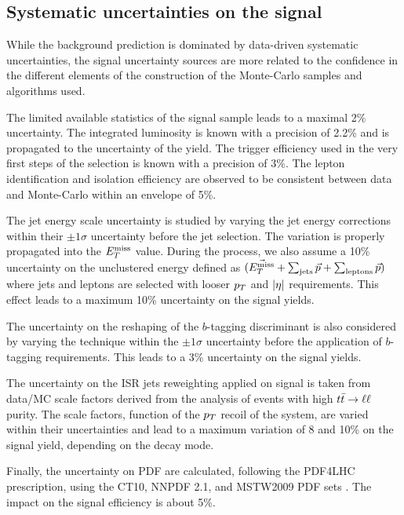     \subsection{Systematic uncertainties on the signal}

    While the background prediction is dominated by data-driven systematic
    uncertainties, the signal uncertainty sources are more related to the
    confidence in the different elements of the construction of the Monte-Carlo
    samples and algorithms used.

    The limited available statistics of the signal sample leads to a maximal
    2\% uncertainty. The integrated luminosity is known with a precision of 2.2\%
    and is propagated to the uncertainty of the yield. The trigger efficiency
    used in the very first steps of the selection is known with a precision of 3\%.
    The lepton identification and isolation efficiency are observed to be consistent
    between data and Monte-Carlo within an envelope of 5\%.

    The jet energy scale uncertainty is studied by varying the jet energy corrections
    within their $\pm1\sigma$ uncertainty before the jet selection. The variation is
    properly propagated into the $E_T^\text{miss}$ value. During the process, we also assume a
    10\% uncertainty on the unclustered energy defined as $(\vec{E_T^\text{miss}} + \sum_\text{jets}
    \vec{p} + \sum_\text{leptons} \vec{p})$ where jets and leptons are selected with looser
    $p_T$ and $\left| \eta \right|$ requirements. This effect leads to a maximum 10\% uncertainty on
    the signal yields.

    The uncertainty on the reshaping of the $b$-tagging discriminant is also considered
    by varying the technique within the $\pm1\sigma$ uncertainty before the application of
    $b$-tagging requirements. This leads to a 3\% uncertainty on the signal yields.

    The uncertainty on the ISR jets reweighting applied on signal is taken from data/MC
    scale factors derived from the analysis of events with high $t\bar{t} \rightarrow \ell \ell$ purity. The
    scale factors, function of the $p_T$ recoil of the system, are varied within their
    uncertainties and lead to a maximum variation of 8 and 10\% on the signal yield, depending
    on the decay mode.

    Finally, the uncertainty on PDF are calculated, following the PDF4LHC prescription,
    using the CT10, NNPDF 2.1, and MSTW2009 PDF sets \cite{PDF4LHC}. The impact on the
    signal efficiency is about 5\%.

